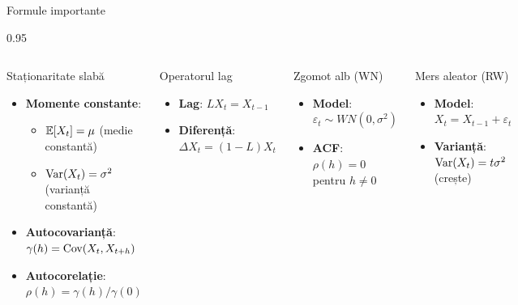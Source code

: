 \documentclass[9pt, aspectratio=169, t]{beamer}
\begin{document}
\begin{frame}{Formule importante}
    \begin{cminipage}{0.95\textwidth}
        \begin{columns}[T]
            {\small
            \begin{block}{Staționaritate slabă}
                \begin{itemize}\setlength{\itemsep}{0pt}
                    \item \textbf{Momente constante}:
                    \begin{itemize}
                        \item $\mathbb{E}[X_t] = \mu$ (medie constantă)
                        \item $\text{Var}(X_t) = \sigma^2$ (varianță constantă)
                    \end{itemize}
                    \item \textbf{Autocovarianță}: $\gamma(h) = \text{Cov}(X_t, X_{t+h})$
                    \item \textbf{Autocorelație}: $\rho(h) = \gamma(h)/\gamma(0)$
                \end{itemize}
            \end{block}

            \begin{block}{Operatorul lag}
                \begin{itemize}\setlength{\itemsep}{0pt}
                    \item \textbf{Lag}: $LX_t = X_{t-1}$
                    \item \textbf{Diferență}: $\Delta X_t = (1-L)X_t$
                \end{itemize}
            \end{block}
            }

            {\small
            \begin{exampleblock}{Zgomot alb (WN)}
                \begin{itemize}\setlength{\itemsep}{0pt}
                    \item \textbf{Model}: $\varepsilon_t \sim WN(0, \sigma^2)$
                    \item \textbf{ACF}: $\rho(h) = 0$ pentru $h \neq 0$
                \end{itemize}
            \end{exampleblock}

            \begin{alertblock}{Mers aleator (RW)}
                \begin{itemize}\setlength{\itemsep}{0pt}
                    \item \textbf{Model}: $X_t = X_{t-1} + \varepsilon_t$
                    \item \textbf{Varianță}: $\text{Var}(X_t) = t\sigma^2$ (crește)
                \end{itemize}
            \end{alertblock}
            }
        \end{columns}
    \end{cminipage}
\end{frame}
\end{document}
